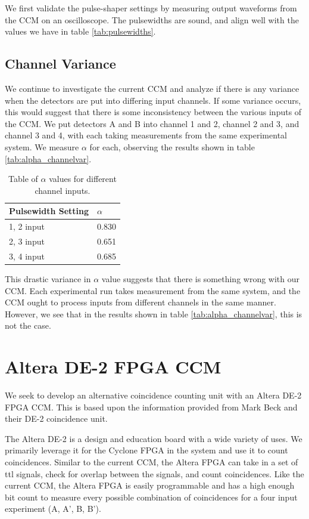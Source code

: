 \documentclass[letterpaper, 11 pt]{article}
\begin{document}
We first validate the pulse-shaper settings by measuring output waveforms from the CCM on an oscilloscope.
The pulsewidths are sound, and align well with the values we have in table \ref{tab:pulsewidths}.

\subsection{Channel Variance}

We continue to investigate the current CCM and analyze if there is any variance when the detectors
are put into differing input channels. If some variance occurs, this would suggest that there is some
inconsistency between the various inputs of the CCM. We put detectors A and B into channel 1 and 2,
channel 2 and 3, and channel 3 and 4, with each taking measurements from the same experimental system.
We measure $\alpha$ for each, observing the results shown in table \ref{tab:alpha_channelvar}.
\begin{table}[H]
    \centering
    \begin{tabular}{|l|l|}
    \hline
    \textbf{Pulsewidth Setting} & \textbf{$\alpha$} \\ \hline
    1, 2 input        & 0.830                   \\ \hline
    2, 3 input        & 0.651                   \\ \hline
    3, 4 input        & 0.685                   \\ \hline
    \end{tabular}
    \caption{Table of $\alpha$ values for different channel inputs.}
\end{table}\label{tab:alpha_channelvar}
This drastic variance in $\alpha$ value suggests that there is something wrong with our CCM.
Each experimental run takes measurement from the same system, and the CCM ought to process inputs
from different channels in the same manner. However, we see that in the results shown in table \ref{tab:alpha_channelvar},
this is not the case.

\section{Altera DE-2 FPGA CCM}

We seek to develop an alternative coincidence counting unit with an Altera DE-2 FPGA CCM.
This is based upon the information provided from Mark Beck and their DE-2 coincidence unit.

The Altera DE-2 is a design and education board with a wide variety of uses. We primarily leverage it
for the Cyclone FPGA in the system and use it to count coincidences. Similar to the current CCM,
the Altera FPGA can take in a set of ttl signals, check for overlap between the signals, and count coincidences.
Like the current CCM, the Altera FPGA is easily programmable and has a high enough bit count to measure every possible
combination of coincidences for a four input experiment (A, A', B, B').
\end{document}
